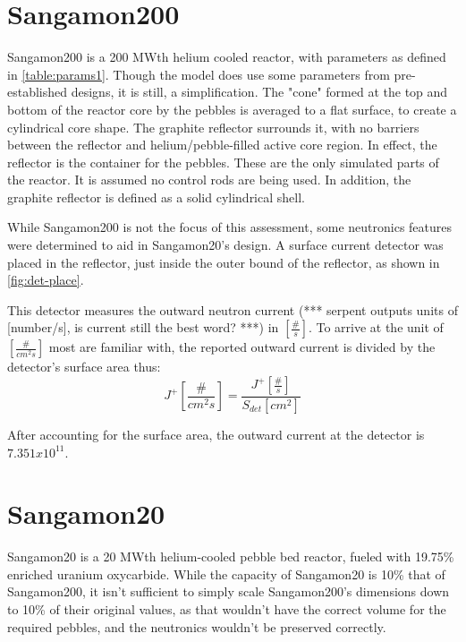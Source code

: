 





\section{Sangamon200}
Sangamon200 is a 200 MWth helium cooled reactor, with parameters as defined in \ref{table:params1}.  Though the model does use some parameters from pre-established designs, it is still, a simplification.  The "cone" formed at the top and bottom of the reactor core by the pebbles  is averaged to a flat surface, to create a cylindrical core shape.  The graphite reflector surrounds it, with no barriers between the reflector and helium/pebble-filled active core region.  In effect, the reflector is the container for the pebbles.  These are the only simulated parts of the reactor.  It is assumed no control rods are being used.  In addition, the graphite reflector is defined as a solid cylindrical shell.

While Sangamon200 is not the focus of this assessment, some neutronics features were determined to aid in Sangamon20's design.  A surface current detector was placed in the reflector, just inside the outer bound of the reflector, as shown in \ref{fig:det-place}.



This detector measures the outward neutron current (*** serpent outputs units of [number/s], is current still the best word? ***) in $[\frac{\#}{s}]$.  To arrive at the unit of $[\frac{\#}{cm^2s}]$ most are familiar with, the reported outward current is divided by the detector's surface area thus:
\begin{equation}
J^+ [\frac{\#}{cm^2s}] = \frac{J^+ [\frac{\#}{s}]}{S_{det}[cm^2]}
\end{equation}

After accounting for the surface area, the outward current at the detector is $7.351x10^{11}$.

\section{Sangamon20}

Sangamon20 is a 20 MWth helium-cooled pebble bed reactor, fueled with 19.75\% enriched uranium oxycarbide.  While the capacity of Sangamon20 is 10\% that of Sangamon200, it isn't sufficient to simply scale Sangamon200's dimensions down to 10\% of their original values, as that wouldn't have the correct volume for the required pebbles, and the neutronics wouldn't be preserved correctly.

